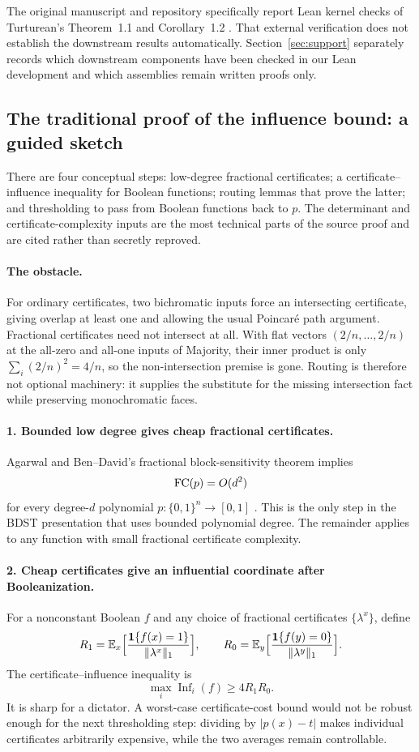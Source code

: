 \documentclass[11pt]{article}
\theoremstyle{definition}\newtheorem{definition}[theorem]{Definition}
\theoremstyle{remark}\newtheorem{remark}[theorem]{Remark}
\newcommand{\E}{\mathbb E}\newcommand{\Prb}{\mathbb P}
\DeclareMathOperator{\Inf}{Inf}\DeclareMathOperator{\Var}{Var}
\begin{document}
The original manuscript and repository specifically report Lean kernel checks of Turturean's Theorem~1.1 and Corollary~1.2 \cite{Tur26}. That external verification does not establish the downstream results automatically. Section~\ref{sec:support} separately records which downstream components have been checked in our Lean development and which assemblies remain written proofs only.

\subsection{The traditional proof of the influence bound: a guided sketch}\label{sec:aa-sketch}
There are four conceptual steps: low-degree fractional certificates; a certificate--influence inequality for Boolean functions; routing lemmas that prove the latter; and thresholding to pass from Boolean functions back to \(p\). The determinant and certificate-complexity inputs are the most technical parts of the source proof and are cited rather than secretly reproved.

\paragraph{The obstacle.}
For ordinary certificates, two bichromatic inputs force an intersecting certificate, giving overlap at least one and allowing the usual Poincaré path argument. Fractional certificates need not intersect at all. With flat vectors \((2/n,\ldots,2/n)\) at the all-zero and all-one inputs of Majority, their inner product is only \(\sum_i(2/n)^2=4/n\), so the non-intersection premise is gone. Routing is therefore not optional machinery: it supplies the substitute for the missing intersection fact while preserving monochromatic faces.

\paragraph{1. Bounded low degree gives cheap fractional certificates.}
Agarwal and Ben--David's fractional block-sensitivity theorem implies
\[
 \operatorname{FC}(p)=O(d^2)
\]
for every degree-\(d\) polynomial \(p:\{0,1\}^n\to[0,1]\) \cite[Fact~2.4 and the cited ABD result]{BDST26}. This is the only step in the BDST presentation that uses bounded polynomial degree. The remainder applies to any function with small fractional certificate complexity.

\paragraph{2. Cheap certificates give an influential coordinate after Booleanization.}
For a nonconstant Boolean \(f\) and any choice of fractional certificates \(\{\lambda^x\}\), define
\[
 R_1=\E_x\Bigl[\frac{\mathbf 1\{f(x)=1\}}{\|\lambda^x\|_1}\Bigr],\qquad
 R_0=\E_y\Bigl[\frac{\mathbf 1\{f(y)=0\}}{\|\lambda^y\|_1}\Bigr].
\]
The certificate--influence inequality \cite[Lemma~2.5]{BDST26} is
\[
 \max_i\Inf_i(f)\ge4R_1R_0.
\]
It is sharp for a dictator. A worst-case certificate-cost bound would not be robust enough for the next thresholding step: dividing by \(|p(x)-t|\) makes individual certificates arbitrarily expensive, while the two averages remain controllable.
\end{document}

